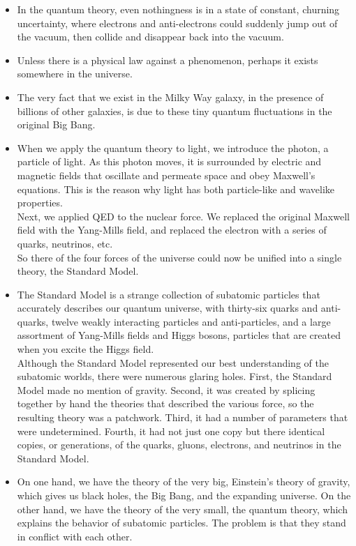 \documentclass[UTF8]{ctexart}
\begin{document}
\begin{itemize}
			\item In the quantum theory, even nothingness is in a state of constant, churning uncertainty, where electrons and anti-electrons could suddenly jump out of the vacuum, then collide and disappear back into the vacuum.
			\item Unless there is a physical law against a phenomenon, perhaps it exists somewhere in the universe.
			\item The very fact that we exist in the Milky Way galaxy, in the presence of billions of other galaxies, is due to these tiny quantum fluctuations in the original Big Bang.
			\item When we apply the quantum theory to light, we introduce the photon, a particle of light. As this photon moves, it is surrounded by electric and magnetic fields that oscillate and permeate space and obey Maxwell's equations. This is the reason why light has both particle-like and wavelike properties.\\
			Next, we applied QED to the nuclear force. We replaced the original Maxwell field with the Yang-Mills field, and replaced the electron with a series of quarks, neutrinos, etc.\\
			So there of the four forces of the universe could now be unified into a single theory, the Standard Model.
			\item The Standard Model is a strange collection of subatomic particles that accurately describes our quantum universe, with thirty-six quarks and anti-quarks, twelve weakly interacting particles and anti-particles, and a large assortment of Yang-Mills fields and Higgs bosons, particles that are created when you excite the Higgs field.\\
			Although the Standard Model represented our best understanding of the subatomic worlds, there were numerous glaring holes. First, the Standard Model made no mention of gravity. Second, it was created by splicing together by hand the theories that described the various force, so the resulting theory was a patchwork. Third, it had a number of parameters that were undetermined. Fourth, it had not just one copy but there identical copies, or generations, of the quarks, gluons, electrons, and neutrinos in the Standard Model.
			
			\item On one hand, we have the theory of the very big, Einstein's theory of gravity, which gives us black holes, the Big Bang, and the expanding universe. On the other hand, we have the theory of the very small, the quantum theory, which explains the behavior of subatomic particles. The problem is that they stand in conflict with each other.
			

\end{itemize}
\end{document}

